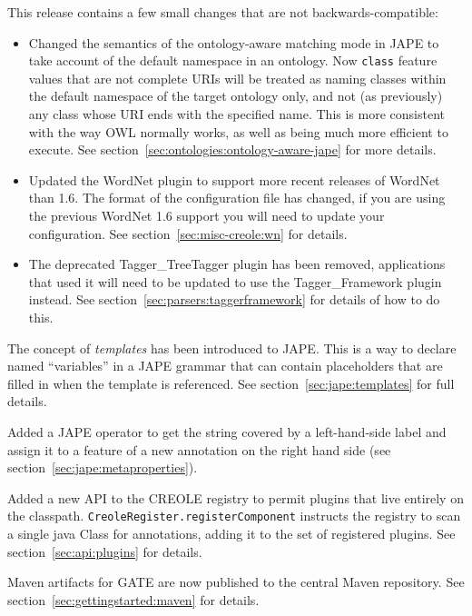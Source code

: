 
This release contains a few small changes that are not backwards-compatible:
\begin{itemize}
\item Changed the semantics of the ontology-aware matching mode in JAPE to take
account of the default namespace in an ontology.  Now {\tt class} feature
values that are not complete URIs will be treated as naming classes within the
default namespace of the target ontology only, and not (as previously) any
class whose URI ends with the specified name.  This is more consistent with the
way OWL normally works, as well as being much more efficient to execute.  See
section~\ref{sec:ontologies:ontology-aware-jape} for more details.

\item Updated the WordNet plugin to support more recent releases of WordNet
than 1.6.  The format of the configuration file has changed, if you are using
the previous WordNet 1.6 support you will need to update your configuration.
See section~\ref{sec:misc-creole:wn} for details.

\item The deprecated Tagger\_TreeTagger plugin has been removed, applications
that used it will need to be updated to use the Tagger\_Framework plugin
instead.  See section~\ref{sec:parsers:taggerframework} for details of how to
do this.
\end{itemize}


The concept of {\it templates} has been introduced to JAPE.  This is a way to
declare named ``variables'' in a JAPE grammar that can contain placeholders
that are filled in when the template is referenced.  See
section~\ref{sec:jape:templates} for full details.

Added a JAPE operator to get the string covered by a left-hand-side label and
assign it to a feature of a new annotation on the right hand side (see
section~\ref{sec:jape:metaproperties}).

Added a new API to the CREOLE registry to permit plugins that live 
entirely on the classpath. {\tt CreoleRegister.registerComponent} instructs
the registry to scan a single java Class for annotations, adding it to the 
set of registered plugins.  See section~\ref{sec:api:plugins} for details.

Maven artifacts for GATE are now published to the central Maven
repository.  See section~\ref{sec:gettingstarted:maven} for details.

